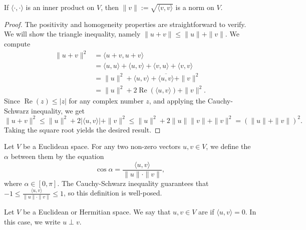 \begin{corollary}
    If $\langle \cdot, \cdot \rangle$ is an inner product on $V$, then $\|v\| := \sqrt{\langle v, v \rangle}$ is a norm on $V$.
\end{corollary}

\begin{proof}
    The positivity and homogeneity properties are straightforward to verify. We will show the triangle inequality, namely $\|u + v\| \leq \|u\| + \|v\|$. We compute
    \begin{align*}
        \|u + v\|^2 &= \langle u + v, u + v \rangle \\
        &= \langle u, u \rangle + \langle u, v \rangle + \langle v, u \rangle + \langle v, v \rangle \\
        &= \|u\|^2 + \langle u, v \rangle + \overline{\langle u, v \rangle} + \|v\|^2 \\
        &= \|u\|^2 + 2 \operatorname{Re}(\langle u, v \rangle) + \|v\|^2.
    \end{align*}
    Since $\operatorname{Re}(z) \leq |z|$ for any complex number $z$, and applying the Cauchy-Schwarz inequality, we get
    \begin{equation*}
        \|u + v\|^2 \leq \|u\|^2 + 2 |\langle u, v \rangle| + \|v\|^2 \leq \|u\|^2 + 2 \|u\| \|v\| + \|v\|^2 = (\|u\| + \|v\|)^2.
    \end{equation*}
    Taking the square root yields the desired result.
\end{proof}

\begin{definition}[Angle]
    Let $V$ be a Euclidean space. For any two non-zero vectors $u, v \in V$, we define the  $\alpha$ between them by the equation
    \begin{equation*}
        \cos \alpha = \frac{\langle u, v \rangle}{\|u\| \cdot \|v\|},
    \end{equation*}
    where $\alpha \in [0, \pi]$. The Cauchy-Schwarz inequality guarantees that $-1 \leq \frac{\langle u, v \rangle}{\|u\| \cdot \|v\|} \leq 1$, so this definition is well-posed.
\end{definition}

\begin{definition*}[Orthogonality]
    Let $V$ be a Euclidean or Hermitian space. We say that $u, v \in V$ are  if $\langle u, v \rangle = 0$. In this case, we write $u \perp v$.
\end{definition*}

